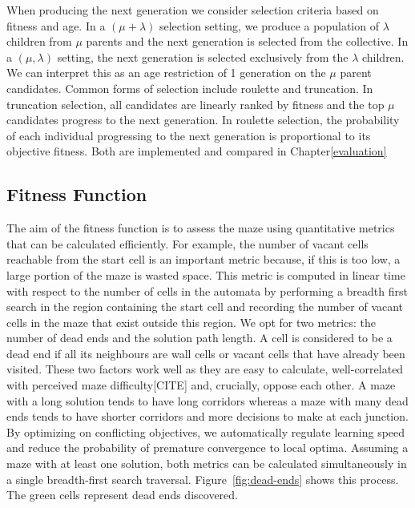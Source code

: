 When producing the next generation we consider selection criteria based on fitness and age. In a $(\mu + \lambda)$ selection setting, we produce a population of $\lambda$ children from $\mu$ parents and the next generation is selected from the collective. In a $(\mu, \lambda)$ setting, the next generation is selected exclusively from the $\lambda$ children. We can interpret this as an age restriction of 1 generation on the $\mu$ parent candidates. Common forms of selection include roulette and truncation. In truncation selection, all candidates are linearly ranked by fitness and the top $\mu$ candidates progress to the next generation. In roulette selection, the probability of each individual progressing to the next generation is proportional to its objective fitness. Both are implemented and compared in Chapter\ref{evaluation}\\

\subsection{Fitness Function}
The aim of the fitness function is to assess the maze using quantitative metrics that can be calculated efficiently. For example, the number of vacant cells reachable from the start cell is an important metric because, if this is too low, a large portion of the maze is wasted space. This metric is computed in linear time with respect to the number of cells in the automata by performing a breadth first search in the region containing the start cell and recording the number of vacant cells in the maze that exist outside this region. We opt for two metrics: the number of dead ends and the solution path length. A cell is considered to be a dead end if all its neighbours are wall cells or vacant cells that have already been visited. These two factors work well as they are easy to calculate, well-correlated with perceived maze difficulty[CITE] and, crucially, oppose each other. A maze with a long solution tends to have long corridors whereas a maze with many dead ends tends to have shorter corridors and more decisions to make at each junction. By optimizing on conflicting objectives, we automatically regulate learning speed and reduce the probability of premature convergence to local optima. Assuming a maze with at least one solution, both metrics can be calculated simultaneously in a single breadth-first search traversal. Figure~\ref{fig:dead-ends} shows this process. The green cells represent dead ends discovered.\\

